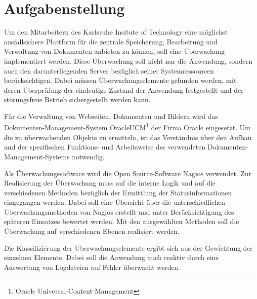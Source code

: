 \section{Aufgabenstellung}

Um den Mitarbeitern des Karlsruhe Insitute of Technology eine möglichst ausfallsichere Plattform für die zentrale Speicherung, Bearbeitung und Verwaltung von Dokumenten anbieten zu können, soll eine Überwachung implementiert werden.
Diese Überwachung soll nicht nur die Anwendung, sondern auch den darunterliegenden Server bezüglich seiner Systemressourcen berücksichtigen.
Dabei müssen Überwachungselemente gefunden werden, mit deren Überprüfung der eindeutige Zustand der Anwendung festgestellt und der störungsfreie Betrieb sichergestellt werden kann.

Für die Verwaltung von Webseiten, Dokumenten und Bildern wird das Dokumenten-Management-System \gls{OracleUCM}\footnote{Oracle Universal-Content-Management} der Firma Oracle eingesetzt.
Um die zu überwachenden Objekte zu ermitteln, ist das Verständnis über den Aufbau und der spezifischen Funktions- und Arbeitsweise des verwendeten Dokumenten-Management-Systems notwendig.

Als Überwachungssoftware wird die Open Source-Software Nagios verwendet.
Zur Realisierung der Überwachung muss auf die interne Logik und auf die verschiedenen Methoden bezüglich der Ermittlung der Statusinformationen eingegangen werden.
Dabei soll eine Übersicht über die unterschiedlichen Überwachungsmethoden von Nagios erstellt und unter Berücksichtigung des späteren Einsatzes bewertet werden.
Mit den ausgewählten Methoden soll die Überwachung auf verschiedenen Ebenen realisiert werden.

Die Klassifizierung der Überwachungselemente ergibt sich aus der Gewichtung der einzelnen Elemente.
Dabei soll die Anwendung auch reaktiv durch eine Auswertung von Logdateien auf Fehler überwacht werden.


